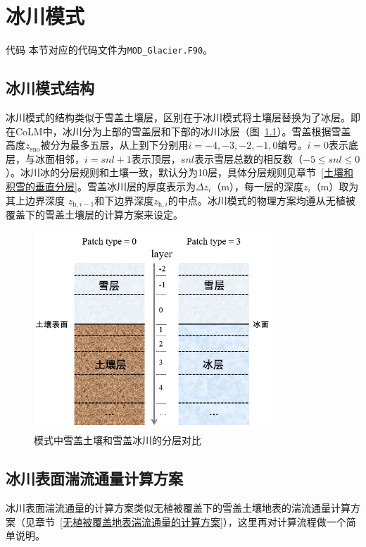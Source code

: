 \chapter{冰川模式}
\begin{mymdframed}{代码}
  本节对应的代码文件为\texttt{MOD\_Glacier.F90}。
\end{mymdframed}
\section{冰川模式结构}
冰川模式的结构类似于雪盖土壤层，区别在于冰川模式将土壤层替换为了冰层。即在CoLM中，冰川分为上部的雪盖层和下部的冰川冰层（图~\ref{fig:模式中雪盖土壤和雪盖冰川的分层对比}）。雪盖根据雪盖高度$z_{\mathrm{sno}}$被分为最多五层，从上到下分别用$i=-4,-3,-2,-1,0$编号。$i=0$表示底层，与冰面相邻，$i=snl+1$表示顶层，$snl$表示雪层总数的相反数（$-5\leqslant snl\leqslant 0$）。冰川冰的分层规则和土壤一致，默认分为10层，具体分层规则见章节~\ref{土壤和积雪的垂直分层}。雪盖冰川层的厚度表示为$\Delta z_i$（m），每一层的深度$z_i$（m）取为其上边界深度 $z_{\mathrm{h},i-1}$和下边界深度$z_{\mathrm{h},i}$的中点。冰川模式的物理方案均遵从无植被覆盖下的雪盖土壤层的计算方案来设定。

{
  \begin{figure}[htbp]
    \centering
    \includegraphics[width=0.8\textwidth]{Figures/冰川模式/模式中雪盖土壤和雪盖冰川的分层对比.jpg}
    \caption{模式中雪盖土壤和雪盖冰川的分层对比}
    \label{fig:模式中雪盖土壤和雪盖冰川的分层对比}
  \end{figure}
}

\section{冰川表面湍流通量计算方案}
冰川表面湍流通量的计算方案类似无植被覆盖下的雪盖土壤地表的湍流通量计算方案（见章节~\ref{无植被覆盖地表湍流通量的计算方案}），这里再对计算流程做一个简单说明。

